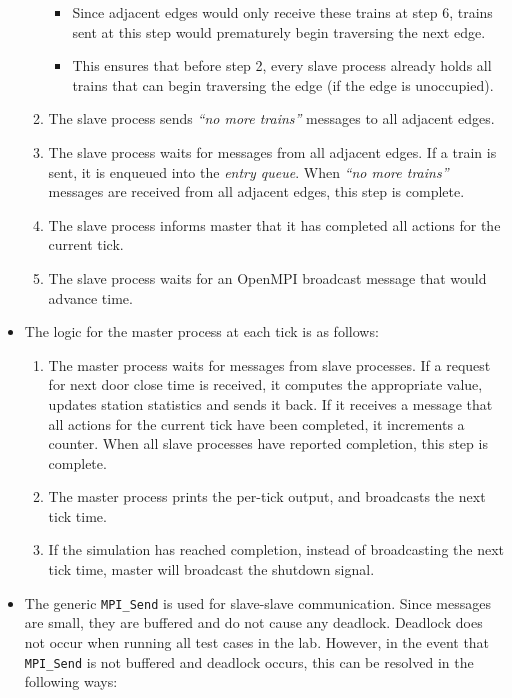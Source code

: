 \documentclass[a4paper,12pt]{article}
\begin{document}
\begin{itemize}
\begin{enumerate}
		            \begin{itemize}
			            \item Since adjacent edges would only receive these trains at step 6, trains sent at this step would prematurely begin traversing the next edge.
			            \item This ensures that before step 2, every slave process already holds all trains that can begin traversing the edge (if the edge is unoccupied).
		            \end{itemize}
		      \item The slave process sends \textit{``no more trains''} messages to all adjacent edges.
		      \item The slave process waits for messages from all adjacent edges. If a train is sent, it is enqueued into the \textit{entry queue}. When \textit{``no more trains''} messages are received from all adjacent edges, this step is complete.
		      \item The slave process informs master that it has completed all actions for the current tick.
		      \item The slave process waits for an OpenMPI broadcast message that would advance time.
	      \end{enumerate}
	\item The logic for the master process at each tick is as follows:
	      \begin{enumerate}
		      \item The master process waits for messages from slave processes. If a request for next door close time is received, it computes the appropriate value, updates station statistics and sends it back. If it receives a message that all actions for the current tick have been completed, it increments a counter. When all slave processes have reported completion, this step is complete.
		      \item The master process prints the per-tick output, and broadcasts the next tick time.
		      \item If the simulation has reached completion, instead of broadcasting the next tick time, master will broadcast the shutdown signal.
		  \end{enumerate}
	\item The generic \texttt{MPI_Send} is used for slave-slave communication. Since messages are small, they are buffered and do not cause any deadlock. Deadlock does not occur when running all test cases in the lab. However, in the event that \texttt{MPI_Send} is not buffered and deadlock occurs, this can be resolved in the following ways:

\end{itemize}
\end{document}
